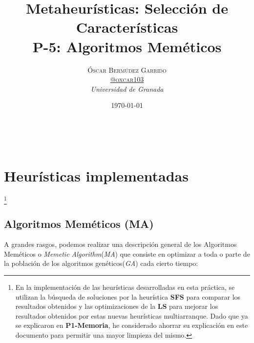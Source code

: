 \documentclass[a4paper, 11pt]{article}
\title{\textbf{Metaheurísticas: Selección de Características}\\ %
P-5: Algoritmos Meméticos} %
\author{\textsc{Óscar Bermúdez Garrido\\
\href{http://www.github.com/oxcar103}{@oxcar103}} %
\\{\textit{Universidad de Granada}}} %
\date{\today} %
\makeatletter
\renewcommand{\maketitle}{
  \begin{flushright} %
  {\LARGE\@title} %
  
  \vspace{50pt} %
  
  {\large\@author} %
  \\\@date %
  \vspace{40pt} %
  \end{flushright}
}
\makeatother
\begin{document}
\maketitle %

\renewcommand{\abstractname}{Resumen} %



{\parskip=2pt
  \tableofcontents
}
\pagebreak

	
	
	
	\section{Heurísticas implementadas}\footnote{En la implementación de las heurísticas desarrolladas
	en esta práctica, se utilizan la búsqueda de soluciones por la heurística \textbf{SFS} para comparar
	los resultados obtenidos y las optimizaciones de la \textbf{LS} para mejorar los resultados obtenidos
	por estas nuevas heurísticas multiarranque. Dado que ya se explicaron en \textbf{P1-Memoria}, he
	considerado ahorrar su explicación en este documento para permitir una mayor limpieza del mismo.}
	
		\subsection{Algoritmos Meméticos (\textbf{MA})}
			A grandes rasgos, podemos realizar una descripción general de los Algoritmos Meméticos o
			\textit{Memetic Algorithm}(\textit{MA}) que consiste en optimizar a toda o parte de la
			población de los algoritmos genéticos(\textit{GA}) cada cierto tiempo:
			
\end{document}
